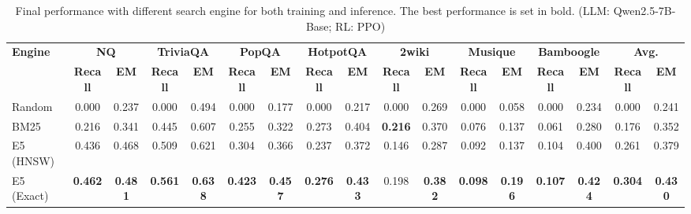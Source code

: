 \begin{table}[t]
    \centering
    \scriptsize
    \setlength{\tabcolsep}{2.6pt}
    
    \caption{Final performance with different search engine for both training and inference. The best performance is set in bold. (LLM: Qwen2.5-7B-Base; RL: PPO)}\label{tab:train-retriever}
    \begin{tabular}{lcccccccccccccccc}
        \toprule
        \textbf{Engine} & \multicolumn{2}{c}{\textbf{NQ}} & \multicolumn{2}{c}{\textbf{TriviaQA}} & \multicolumn{2}{c}{\textbf{PopQA}} & \multicolumn{2}{c}{\textbf{HotpotQA}} & \multicolumn{2}{c}{\textbf{2wiki}} & \multicolumn{2}{c}{\textbf{Musique}} & \multicolumn{2}{c}{\textbf{Bamboogle}} & \multicolumn{2}{c}{\textbf{Avg.}}  \\
        \cmidrule(lr){2-3} \cmidrule(lr){4-5} \cmidrule(lr){6-7} \cmidrule(lr){8-9} \cmidrule(lr){10-11} \cmidrule(lr){12-13} \cmidrule(lr){14-15} \cmidrule(lr){16-17}
         & \textbf{Recall} & \textbf{EM} & \textbf{Recall} & \textbf{EM} & \textbf{Recall} & \textbf{EM} & \textbf{Recall} & \textbf{EM} & \textbf{Recall} & \textbf{EM} & \textbf{Recall} & \textbf{EM} & \textbf{Recall} & \textbf{EM} & \textbf{Recall} & \textbf{EM}  \\
        \midrule
        Random & 0.000 & 0.237 & 0.000 & 0.494 & 0.000 & 0.177 & 0.000 & 0.217 & 0.000 & 0.269 & 0.000 & 0.058 & 0.000 & 0.234	 & 0.000 & 0.241 \\
        BM25 & 0.216 & 0.341 & 0.445 & 0.607 & 0.255 & 0.322 & 0.273 & 0.404 & \textbf{0.216} & 0.370 & 0.076 & 0.137 & 0.061 & 0.280 & 0.176 & 0.352  \\
        E5 (HNSW) &  0.436 & 0.468 & 0.509 & 0.621 & 0.304 & 0.366 & 0.237 & 0.372 & 0.146 & 0.287 & 0.092 & 0.137 & 0.104 & 0.400	 & 0.261 & 0.379 \\
        E5 (Exact) &  \textbf{0.462} & \textbf{0.481} & \textbf{0.561} & \textbf{0.638} & \textbf{0.423} & \textbf{0.457} & \textbf{0.276} & \textbf{0.433} & 0.198 & \textbf{0.382} & \textbf{0.098} & \textbf{0.196} & \textbf{0.107} & \textbf{0.424} & \textbf{0.304} & \textbf{0.430} \\
        \bottomrule
    \end{tabular}
    
\end{table}

